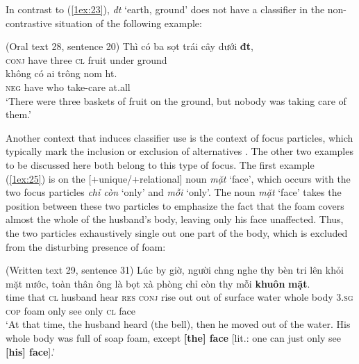 \documentclass[output=paper]{langsci/langscibook}
\begin{document}
In contrast to (\ref{1ex:23}), {\emph{đ{\daa}t}} `earth, ground' does not have a classifier in the non-contrastive situation of the following example:

\begin{samepage}
\begin{exe}
\ex\label{1ex:24}
(Oral text 28, sentence 20)
\exi{}
\gll Thì      có     ba     sọt   {trái cây} dưới  {\textbf{đ{\daa}t}},         \\
{\textsc{conj}} have three {\textsc{cl}}  fruit       under ground  \\
\glt
\exi{}
\gll không có     ai     {trông nom}  h{\dae}t. \\
{\textsc{neg}}   have who take-care    at.all \\
\glt `There were three baskets of fruit on the ground, but nobody was taking care of them.'
\end{exe}
\end{samepage}

Another context that induces classifier use is the context of focus particles, which typically mark the inclusion or exclusion of alternatives \citep{konig:91}. The other two examples to be discussed here both belong to this type of focus. The first example (\ref{1ex:25}) is on the [+unique/+relational] noun {\emph{mặt}} `face', which occurs with the two focus particles {\emph{chỉ còn}} `only' and {\emph{mỗi}} `only'. The noun {\emph{mặt}} `face' takes the position between these two particles to emphasize the fact that the foam covers almost the whole of the husband's body, leaving only his face unaffected. Thus, the two particles exhaustively single out one part of the body, which is excluded from the disturbing presence of foam:

\begin{exe}
\ex\label{1ex:25}
(Written text 29, sentence 31)
\exi{}
\gll Lúc  {b{\daa}y giờ}, người  ch{\daob}ng     nghe th{\daa}y   bèn      tr{\daob}i  lên khỏi     mặt       nước, toàn    thân  ông    là      {bọt xà phòng}  {chỉ còn}  th{\daa}y  mỗi   {\textbf{khuôn}} {\textbf{mặt}}. \\
time that        {\textsc{cl}}      husband hear   {\textsc{res}}  {\textsc{conj}}  rise  out {out of}  surface  water whole body 3.{\textsc{sg}} {\textsc{cop}}  foam                only      see   only  {\textsc{cl}}       face \\
\glt `At that time, the husband heard (the bell), then he moved out of the water. His whole body was full of soap foam, except {\textbf{[the] face}} [lit.: one can just only see {\textbf{[his] face}}].'
\end{exe}
\end{document}
